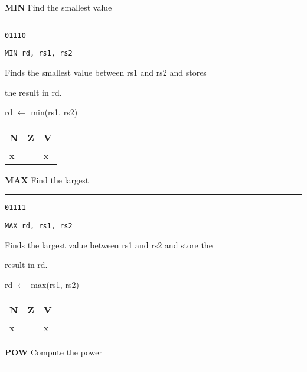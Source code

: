 \documentclass{article}
\begin{document}
\bigskip\bigskip

\flushleft
\LARGE\textbf{MIN} \large \hfill Find the smallest value

\kern-3pt
\noindent\rule{16.5cm}{0.4pt}
\normalsize

{\large
	 \texttt{01110} \par
	\smallbreak
	 \texttt{MIN rd, rs1, rs2} \par
	\smallbreak
	 Finds the smallest value between rs1 and rs2 and stores \par
	\makebox[3.5cm][l]{  } the result in rd. \par
	\smallbreak
	 rd $\leftarrow$ min(rs1, rs2) \par
	\smallbreak
	 \begin{tabular}{lll} N \quad & Z \quad & V \\ \hline x & - & x \\ \end{tabular}
}

\pagebreak

\flushleft
\LARGE\textbf{MAX} \large \hfill Find the largest

\kern-3pt
\noindent\rule{16.5cm}{0.4pt}
\normalsize

{\large
	 \texttt{01111} \par
	\smallbreak
	 \texttt{MAX rd, rs1, rs2} \par
	\smallbreak
	 Finds the largest value between rs1 and rs2 and store the \par
	\makebox[3.5cm][l]{  } result in rd. \par
	\smallbreak
	 rd $\leftarrow$ max(rs1, rs2) \par
	\smallbreak
	 \begin{tabular}{lll} N \quad & Z \quad & V \\ \hline x & - & x \\ \end{tabular}
}

\bigskip\bigskip

\flushleft
\LARGE\textbf{POW} \large \hfill Compute the power

\kern-3pt
\noindent\rule{16.5cm}{0.4pt}
\normalsize
\end{document}
